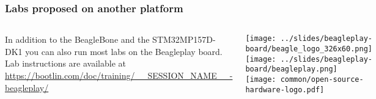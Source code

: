 \begin{frame}
\frametitle{Labs proposed on another platform}
  \begin{columns}
    In addition to the BeagleBone and the STM32MP157D-DK1 you can also run
    most labs on the Beagleplay board.\\
    \vspace{1em}
    Lab instructions are available at\\
    {\small \url{https://bootlin.com/doc/training/__SESSION_NAME__-beagleplay/}}
    \begin{center}
      \texttt{[image: ../slides/beagleplay-board/beagle\_logo\_326x60.png]}\\
      \texttt{[image: ../slides/beagleplay-board/beagleplay.png]}\\
      \texttt{[image: common/open-source-hardware-logo.pdf]}
    \end{center}
  \end{columns}
\end{frame}
